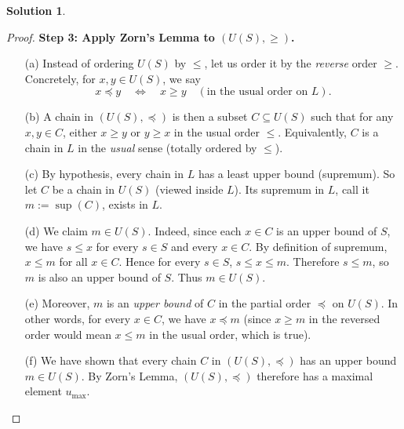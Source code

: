 \documentclass[12pt]{article}
\theoremstyle{definition} %
\newtheorem{solution}{Solution}
\theoremstyle{plain} %
\begin{document}
\begin{solution}
\begin{proof}
        \vspace{0.3cm}
        \textbf{Step 3: Apply Zorn's Lemma to $(U(S), \ge)$.}
        \begin{enumerate}
            \item[(a)] Instead of ordering $U(S)$ by $\le$, let us order it by the \emph{reverse} order $\ge$. Concretely, for $x,y \in U(S)$, we say
            \[
               x \preceq y \quad \Longleftrightarrow \quad x \ge y 
               \quad (\text{in the usual order on } L).
            \]
            \item[(b)] A chain in $(U(S), \preceq)$ is then a subset $C \subseteq U(S)$ such that for any $x,y \in C$, either $x \ge y$ or $y \ge x$ in the usual order $\le$. Equivalently, $C$ is a chain in $L$ in the \emph{usual} sense (totally ordered by $\le$).
            \item[(c)] By hypothesis, every chain in $L$ has a least upper bound (supremum). So let $C$ be a chain in $U(S)$ (viewed inside $L$). Its supremum in $L$, call it $m := \sup(C)$, exists in $L$.
            \item[(d)] We claim $m \in U(S)$. Indeed, since each $x \in C$ is an upper bound of $S$, we have $s \le x$ for every $s \in S$ and every $x \in C$. By definition of supremum, $x \le m$ for all $x \in C$. Hence for every $s \in S$, $s \le x \le m$. Therefore $s \le m$, so $m$ is also an upper bound of $S$. Thus $m \in U(S)$.
            \item[(e)] Moreover, $m$ is an \emph{upper bound} of $C$ in the partial order $\preceq$ on $U(S)$. In other words, for every $x \in C$, we have $x \preceq m$ (since $x \ge m$ in the reversed order would mean $x \le m$ in the usual order, which is true).
            \item[(f)] We have shown that every chain $C$ in $(U(S), \preceq)$ has an upper bound $m \in U(S)$. By Zorn's Lemma, $(U(S), \preceq)$ therefore has a maximal element $u_{\mathrm{max}}$.
        \end{enumerate}
        

\end{proof}
\end{solution}
\end{document}
